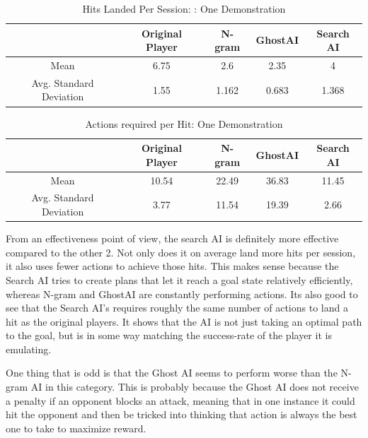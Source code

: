 \begin{table}[h]
	\centering
	\caption{Hits Landed Per Session: : One Demonstration }
	\begin{tabular}	{| c | c | c | c | c | }
		\hline
		& Original Player & N-gram & GhostAI & Search AI \\
		\hline
		Mean &
		6.75 & 2.6 & 2.35 & 4\\
		\hline
		Avg. Standard Deviation &
		1.55 & 1.162 & 0.683 & 1.368\\
		\hline
	\end{tabular}
	\label{Effectiveness1}
\end{table}


\begin{table}[h]
	\centering
	\caption{Actions required per Hit:  One Demonstration }
	\begin{tabular}	{| c | c | c | c | c | }
		\hline
		& Original Player & N-gram & GhostAI & Search AI \\
		\hline
		Mean &
		10.54 & 22.49 & 36.83 & 11.45\\
		\hline
		Avg. Standard Deviation &
		3.77 & 11.54 & 19.39 & 2.66\\
		\hline
	\end{tabular}
	\label{Effectiveness2}
\end{table}

From an effectiveness point of view, the search AI is definitely more effective compared to the other 2. Not only does it on average land more hits per session, it also uses fewer actions to achieve those hits. This makes sense because the Search AI tries to create plans that let it reach a goal state relatively efficiently, whereas N-gram and GhostAI are constantly performing actions. Its also good to see that the Search AI's requires roughly the same number of actions to land a hit as the original players. It shows that the AI is not just taking an optimal path to the goal, but is in some way matching the success-rate of the player it is emulating. 

One thing that is odd is that the Ghost AI seems to perform worse than the N-gram AI in this category. This is probably because the Ghost AI does not receive a penalty if an opponent blocks an attack, meaning that in one instance it could hit the opponent and then be tricked into thinking that action is always the best one to take to maximize reward.


